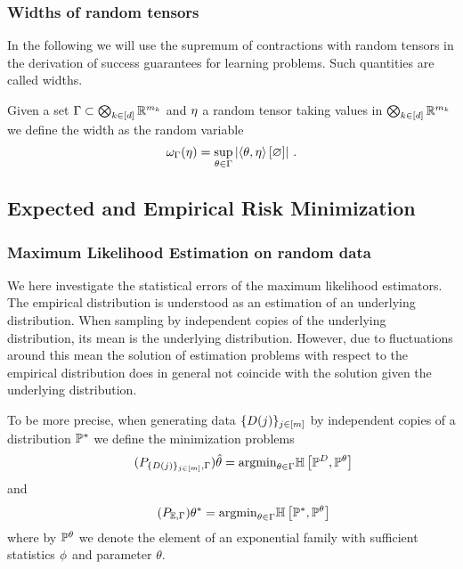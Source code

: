 \subsubsection{Widths of random tensors}

In the following we will use the supremum of contractions with random tensors in the derivation of success guarantees for learning problems.
Such quantities are called widths.

\begin{definition}
	Given a set $\Gamma\subset\bigotimes_{k\in[d]} \mathbb{R}^{m_{k}}$ and $\eta$ a random tensor taking values in $\bigotimes_{k\in[d]} \mathbb{R}^{m_{k}}$ we define the width as the random variable
		\[ \omega_{\Gamma}(\eta) = \sup_{\theta\in\Gamma} \left|\left\langle \theta,\eta\right\rangle \left[ \varnothing \right]\right| \, . \]	
\end{definition}



\subsection{Expected and Empirical Risk Minimization}


\subsubsection{Maximum Likelihood Estimation on random data}

We here investigate the statistical errors of the maximum likelihood estimators.
The empirical distribution is understood as an estimation of an underlying distribution.
When sampling by independent copies of the underlying distribution, its mean is the underlying distribution.
However, due to fluctuations around this mean the solution of estimation problems with respect to the empirical distribution does in general not coincide with the solution given the underlying distribution.

%
To be more precise, when generating data $\{D(j)\}_{j\in[m]}$ by independent copies of a distribution $\mathbb{P}^*$ we define the minimization problems
\begin{align}\tag{$P_{\data,\Gamma}$}\label{prob:empEstimation}
	\empsolution = \argmin_{\theta\in\Gamma} \centropyof{\empdistribution}{\expdistof{\theta}}
\end{align}
and
\begin{align}\tag{$P_{\mathbb{E},\Gamma}$}\label{prob:expEstimation}
	\expsolution = \argmin_{\theta\in\Gamma} \centropyof{\gendistribution}{\expdistof{\theta}}
\end{align}
where by $\mathbb{P}^{\theta}$ we denote the element of an exponential family with sufficient statistics $\phi$ and parameter $\theta$.


